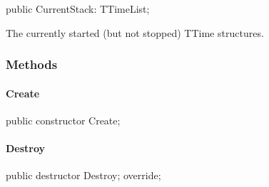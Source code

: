 \documentclass{report}
\begin{document}
\begin{list}{}{
\setlength{\itemindent}{0cm}
\setlength{\listparindent}{0cm}
\setlength{\leftmargin}{\evensidemargin}
\addtolength{\leftmargin}{\tmplength}
\settowidth{\labelsep}{X}
\addtolength{\leftmargin}{\labelsep}
\setlength{\labelwidth}{\tmplength}
}
\begin{flushleft}
\item[\textbf{Declaration}\hfill]
\begin{ttfamily}
public CurrentStack: TTimeList;\end{ttfamily}


\end{flushleft}
\par
\item[\textbf{Description}]
The currently started (but not stopped) TTime structures.

\end{list}
\subsubsection*{\large{\textbf{Methods}}\normalsize\hspace{1ex}\hfill}
\paragraph*{Create}\hspace*{\fill}

\begin{list}{}{
\setlength{\itemindent}{0cm}
\setlength{\listparindent}{0cm}
\setlength{\leftmargin}{\evensidemargin}
\addtolength{\leftmargin}{\tmplength}
\settowidth{\labelsep}{X}
\addtolength{\leftmargin}{\labelsep}
\setlength{\labelwidth}{\tmplength}
}
\begin{flushleft}
\item[\textbf{Declaration}\hfill]
\begin{ttfamily}
public constructor Create;\end{ttfamily}


\end{flushleft}
\end{list}
\paragraph*{Destroy}\hspace*{\fill}

\begin{list}{}{
\setlength{\itemindent}{0cm}
\setlength{\listparindent}{0cm}
\setlength{\leftmargin}{\evensidemargin}
\addtolength{\leftmargin}{\tmplength}
\settowidth{\labelsep}{X}
\addtolength{\leftmargin}{\labelsep}
\setlength{\labelwidth}{\tmplength}
}
\begin{flushleft}
\item[\textbf{Declaration}\hfill]
\begin{ttfamily}
public destructor Destroy; override;\end{ttfamily}


\end{flushleft}
\end{list}
\end{document}
